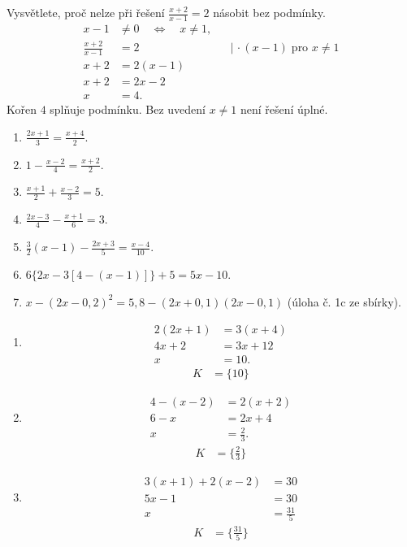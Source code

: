 \documentclass[11pt,a4paper]{article}
\begin{document}
\begin{zadaniReseniBox}[title={Rozšíření 1}]
Vysvětlete, proč nelze při řešení $\frac{x+2}{x-1}=2$ násobit bez podmínky.
\tcblower
\begin{align*}
x-1&\ne0\quad\Longleftrightarrow\quad x\ne1,\\
\frac{x+2}{x-1}&=2&&\big|\,\cdot(x-1)\;\text{pro }x\ne1\\
x+2&=2(x-1)\\
x+2&=2x-2\\
x&=4.
\end{align*}
Kořen $4$ splňuje podmínku. Bez uvedení $x\ne1$ není řešení úplné.
\end{zadaniReseniBox}
\begin{zadaniReseniBox}[title={Domácí úkol}]
\begin{enumerate}[label=\alph*)]
\item $\frac{2x+1}{3}=\frac{x+4}{2}$.
\item $1-\frac{x-2}{4}=\frac{x+2}{2}$.
\item $\frac{x+1}{2}+\frac{x-2}{3}=5$.
\item $\frac{2x-3}{4}-\frac{x+1}{6}=3$.
\item $\frac32(x-1)-\frac{2x+3}{5}=\frac{x-4}{10}$.
\item $6\{2x-3[4-(x-1)]\}+5=5x-10$.
\item $x-(2x-0{,}2)^2=5{,}8-(2x+0{,}1)(2x-0{,}1)$ (úloha č. 1c ze sbírky).
\end{enumerate}
\tcblower
\begin{enumerate}[label=\alph*)]
\item
\[\begin{aligned}2(2x+1)&=3(x+4)\\4x+2&=3x+12\\x&=10.\end{aligned}\]
\[\begin{aligned}K&=\{10\}\end{aligned}\]

\item
\[\begin{aligned}4-(x-2)&=2(x+2)\\6-x&=2x+4\\x&=\tfrac23.\end{aligned}\]
\[\begin{aligned}K&=\{\frac23\}\end{aligned}\]

\item
\[\begin{aligned}
3(x+1)+2(x-2)&=30\\5x-1&=30\\x&=\frac{31}{5}
\end{aligned}\]
\[\begin{aligned}K&=\{\frac{31}{5}\}\end{aligned}\]


\end{enumerate}
\end{zadaniReseniBox}
\end{document}

